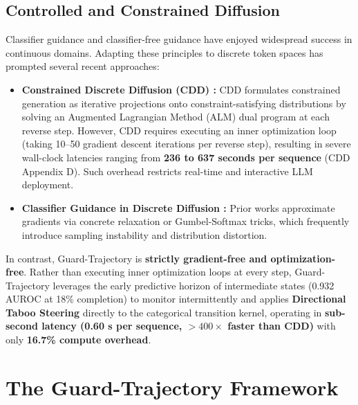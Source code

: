 \documentclass[conference]{IEEEtran}
\begin{document}
\subsection{Controlled and Constrained Diffusion}
Classifier guidance \cite{dhariwal2021diffusion} and classifier-free guidance \cite{ho2022classifier} have enjoyed widespread success in continuous domains. Adapting these principles to discrete token spaces has prompted several recent approaches:
\begin{itemize}
    \item \textbf{Constrained Discrete Diffusion (CDD) \cite{cardei2025cdd}:} CDD formulates constrained generation as iterative projections onto constraint-satisfying distributions by solving an Augmented Lagrangian Method (ALM) dual program at each reverse step. However, CDD requires executing an inner optimization loop (taking 10--50 gradient descent iterations per reverse step), resulting in severe wall-clock latencies ranging from \textbf{236 to 637 seconds per sequence} (CDD Appendix D). Such overhead restricts real-time and interactive LLM deployment.
    \item \textbf{Classifier Guidance in Discrete Diffusion \cite{he2023diffusion,lou2023discrete}:} Prior works approximate gradients via concrete relaxation or Gumbel-Softmax tricks, which frequently introduce sampling instability and distribution distortion.
\end{itemize}
In contrast, Guard-Trajectory is \textbf{strictly gradient-free and optimization-free}. Rather than executing inner optimization loops at every step, Guard-Trajectory leverages the early predictive horizon of intermediate states (0.932 AUROC at 18\% completion) to monitor intermittently and applies \textbf{Directional Taboo Steering} directly to the categorical transition kernel, operating in \textbf{sub-second latency (0.60 s per sequence, $>400\times$ faster than CDD)} with only \textbf{16.7\% compute overhead}.

\section{The Guard-Trajectory Framework}
\end{document}
